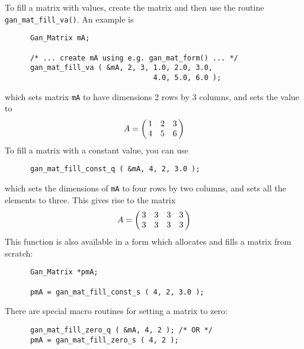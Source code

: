 To fill a matrix with values, create the matrix and then use the routine
{\tt gan\_mat\_fill\_va()}. An example is
\begin{verbatim}
      Gan_Matrix mA;

      /* ... create mA using e.g. gan_mat_form() ... */
      gan_mat_fill_va ( &mA, 2, 3, 1.0, 2.0, 3.0,
                                   4.0, 5.0, 6.0 );
\end{verbatim}
which sets matrix {\tt mA} to have dimensions 2 rows by 3 columns,
and sets the value to
\[ A = \beginm{ccc} 1 & 2 & 3 \\ 4 & 5 & 6 \endm
\]
To fill a matrix with a constant value, you can use
\begin{verbatim}
      gan_mat_fill_const_q ( &mA, 4, 2, 3.0 );
\end{verbatim}
which sets the dimensions of {\tt mA} to four rows by two columns,
and sets all the elements to three. This gives rise to the matrix
\[ A = \beginm{cccc} 3 & 3 & 3 & 3 \\ 3 & 3 & 3 & 3 \endm
\]
This function is also available in a form which allocates and fills a
matrix from scratch:
\begin{verbatim}
      Gan_Matrix *pmA;

      pmA = gan_mat_fill_const_s ( 4, 2, 3.0 );
\end{verbatim}
There are special macro routines for setting a matrix to zero:
\begin{verbatim}
      gan_mat_fill_zero_q ( &mA, 4, 2 ); /* OR */
      pmA = gan_mat_fill_zero_s ( 4, 2 );
\end{verbatim}

